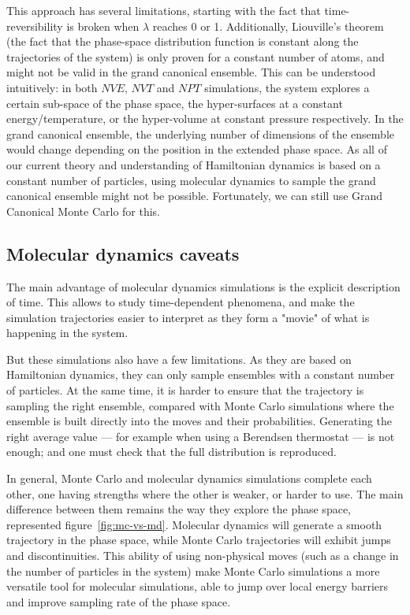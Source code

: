 \documentclass[thesis]{subfiles}
\begin{document}
This approach has several limitations, starting with the fact that
time-reversibility is broken when $\lambda$ reaches 0 or 1. Additionally,
Liouville's theorem (the fact that the phase-space distribution function is
constant along the trajectories of the system) is only proven for a constant
number of atoms, and might not be valid in the grand canonical
ensemble\cite{DelleSite2016}. This can be understood intuitively: in both $NVE$,
$NVT$ and $NPT$ simulations, the system explores a certain sub-space of the
phase space, the hyper-surfaces at a constant energy/temperature, or the
hyper-volume at constant pressure respectively. In the grand canonical ensemble,
the underlying number of dimensions of the ensemble would change depending on the
position in the extended phase space. As all of our current theory and
understanding of Hamiltonian dynamics is based on a constant number of
particles, using molecular dynamics to sample the grand canonical ensemble might
not be possible. Fortunately, we can still use Grand Canonical Monte Carlo for
this.

\subsection{Molecular dynamics caveats}

The main advantage of molecular dynamics simulations is the explicit description
of time. This allows to study time-dependent phenomena, and make the simulation
trajectories easier to interpret as they form a "movie" of what is happening in
the system.

But these simulations also have a few limitations. As they are based on
Hamiltonian dynamics, they can only sample ensembles with a constant number of
particles.  At the same time, it is harder to ensure that the trajectory is
sampling the right ensemble, compared with Monte Carlo simulations where the
ensemble is built directly into the moves and their probabilities. Generating
the right average value --- for example when using a Berendsen thermostat --- is
not enough; and one must check that the full distribution is reproduced.

In general, Monte Carlo and molecular dynamics simulations complete each other,
one having strengths where the other is weaker, or harder to use. The main
difference between them remains the way they explore the phase space,
represented figure~\ref{fig:mc-vs-md}. Molecular dynamics will generate a smooth
trajectory in the phase space, while Monte Carlo trajectories will exhibit jumps
and discontinuities. This ability of using non-physical moves (such as a change
in the number of particles in the system) make Monte Carlo simulations a more
versatile tool for molecular simulations, able to jump over local energy
barriers and improve sampling rate of the phase space.
\end{document}
